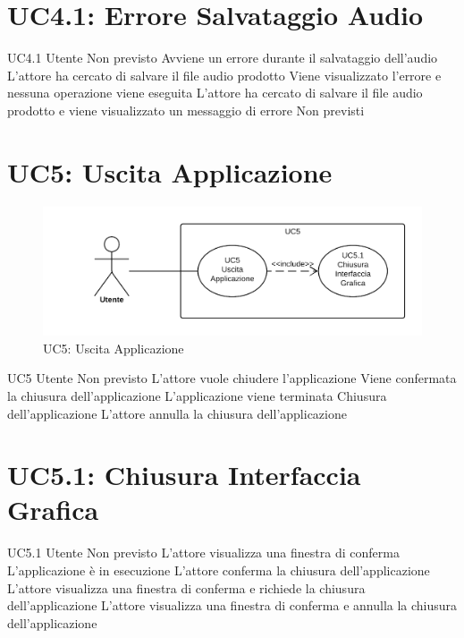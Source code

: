 \documentclass[../AnalisideiRequisiti.tex]{subfiles}
\begin{document}
\section{UC4.1: Errore Salvataggio Audio}
\UserCase
{UC4.1}
{Utente}
{Non previsto}
{Avviene un errore durante il salvataggio dell'audio}
{L'attore ha cercato di salvare il file audio prodotto} 
{Viene visualizzato l'errore e nessuna operazione viene eseguita}
{L'attore ha cercato di salvare il file audio prodotto e viene visualizzato un messaggio di errore}
{Non previsti}

\section{UC5: Uscita Applicazione}
\begin{figure}[H]
	\centering
	\includegraphics[width=\textwidth]{../img/UC5.png}
	\caption{UC5: Uscita Applicazione}
\end{figure}
\UserCase
{UC5}
{Utente}
{Non previsto}
{L'attore vuole chiudere l'applicazione}
{Viene confermata la chiusura dell'applicazione }
{L'applicazione viene terminata}
{Chiusura dell'applicazione}
{L'attore annulla la chiusura dell'applicazione }

\section{UC5.1: Chiusura Interfaccia Grafica}
\UserCase
{UC5.1}
{Utente}
{Non previsto}
{L'attore visualizza una finestra di conferma}
{L'applicazione è in esecuzione}
{L'attore conferma la chiusura dell'applicazione}
{L'attore visualizza una finestra di conferma e richiede la chiusura dell'applicazione}
{L'attore visualizza una finestra di conferma e annulla la chiusura dell'applicazione}
\end{document}
